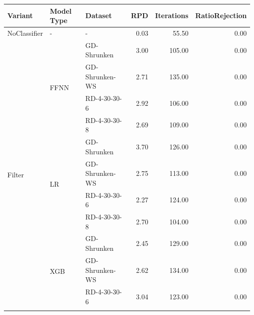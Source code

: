 \begin{table}[ht]
	\small
	\centering
	\renewcommand{\arraystretch}{1.1}
	\begin{tabular}{lllrrr}
		\toprule
		\textbf{Variant}          & \textbf{Model Type}   & \textbf{Dataset} & \textbf{RPD} & \textbf{Iterations} & \textbf{RatioRejection} \\
		\midrule
		NoClassifier              & -                     & -                & 0.03         & 55.50               & 0.00                    \\\hline
		\multirow{12}{*}{Filter}  & \multirow{4}{*}{FFNN} & GD-Shrunken      & 3.00         & 105.00              & 0.00                    \\\cline{3-6}
		                          &                       & GD-Shrunken-WS   & 2.71         & 135.00              & 0.00                    \\\cline{3-6}
		                          &                       & RD-4-30-30-6     & 2.92         & 106.00              & 0.00                    \\\cline{3-6}
		                          &                       & RD-4-30-30-8     & 2.69         & 109.00              & 0.00                    \\\cline{2-6}
		                          & \multirow{4}{*}{LR}   & GD-Shrunken      & 3.70         & 126.00              & 0.00                    \\\cline{3-6}
		                          &                       & GD-Shrunken-WS   & 2.75         & 113.00              & 0.00                    \\\cline{3-6}
		                          &                       & RD-4-30-30-6     & 2.27         & 124.00              & 0.00                    \\\cline{3-6}
		                          &                       & RD-4-30-30-8     & 2.70         & 104.00              & 0.00                    \\\cline{2-6}
		                          & \multirow{4}{*}{XGB}  & GD-Shrunken      & 2.45         & 129.00              & 0.00                    \\\cline{3-6}
		                          &                       & GD-Shrunken-WS   & 2.62         & 134.00              & 0.00                    \\\cline{3-6}
		                          &                       & RD-4-30-30-6     & 3.04         & 123.00              & 0.00                    \\\cline{3-6}

\end{tabular}
\end{table}
